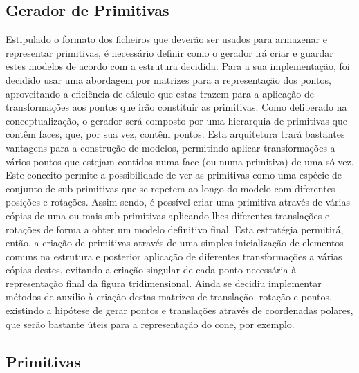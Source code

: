 \subsection{Gerador de Primitivas}

Estipulado o formato dos ficheiros que deverão ser usados para armazenar
e representar primitivas, é necessário definir como o gerador irá criar e
guardar estes modelos de acordo com a estrutura decidida.\newline
\break
\noindent
Para a sua implementação, foi decidido usar uma abordagem por matrizes
para a representação dos pontos, aproveitando a eficiência de cálculo
que estas trazem para a aplicação de transformações aos pontos que irão
constituir as primitivas.\newline
\break
\noindent
Como deliberado na conceptualização, o gerador será composto por uma
hierarquia de primitivas que contêm faces, que, por sua vez, contêm
pontos. Esta arquitetura trará bastantes vantagens para a construção
de modelos, permitindo aplicar transformações a vários pontos que estejam
contidos numa face (ou numa primitiva) de uma só vez.\newline
\break
\noindent
Este conceito permite a possibilidade de ver as primitivas como uma
espécie de conjunto de sub-primitivas que se repetem ao longo do modelo
com diferentes posições e rotações.\newline
\break
\noindent
Assim sendo, é possível criar uma primitiva através de várias cópias
de uma ou mais sub-primitivas aplicando-lhes diferentes translações
e rotações de forma a obter um modelo definitivo final.\newline
\break
\noindent
Esta estratégia permitirá, então, a criação de primitivas através de
uma simples inicialização de elementos comuns na estrutura e posterior
aplicação de diferentes transformações a várias cópias destes, evitando
a criação singular de cada ponto necessária à representação final
da figura tridimensional.\newline
\break
\noindent
Ainda se decidiu implementar métodos de auxilio à criação destas
matrizes de translação, rotação e pontos, existindo a hipótese de
gerar pontos e translações através de coordenadas polares, que serão
bastante úteis para a representação do cone, por exemplo.

\subsection{Primitivas}

